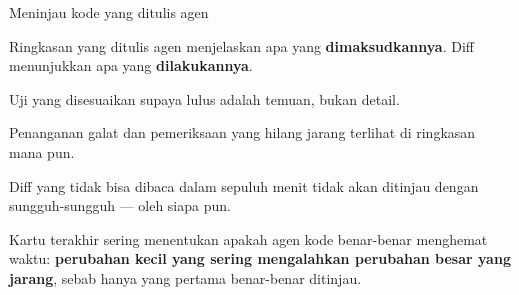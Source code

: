 \documentclass[aspectratio=169,11pt,t]{beamer}
\begin{document}
\begin{frame}[shrink=25]{Meninjau kode yang ditulis agen}
\begin{minipage}[t]{0.494\textwidth}
\begin{icardaccent}
Ringkasan yang ditulis agen menjelaskan apa yang \textbf{dimaksudkannya}. Diff menunjukkan apa yang \textbf{dilakukannya}.
\end{icardaccent}
\end{minipage}%
\hfill
\begin{minipage}[t]{0.494\textwidth}
\begin{icardaccent}
Uji yang disesuaikan supaya lulus adalah temuan, bukan detail.
\end{icardaccent}
\end{minipage}%


\vskip 4pt

\begin{minipage}[t]{0.494\textwidth}
\begin{icard}
Penanganan galat dan pemeriksaan yang hilang jarang terlihat di ringkasan mana pun.
\end{icard}
\end{minipage}%
\hfill
\begin{minipage}[t]{0.494\textwidth}
\begin{icard}
Diff yang tidak bisa dibaca dalam sepuluh menit tidak akan ditinjau dengan sungguh-sungguh --- oleh siapa pun.
\end{icard}
\end{minipage}%
\begin{iband}[signal]
Kartu terakhir sering menentukan apakah agen kode benar-benar menghemat waktu: \textbf{perubahan kecil yang sering mengalahkan perubahan besar yang jarang}, sebab hanya yang pertama benar-benar ditinjau.
\end{iband}
\end{frame}
\end{document}
